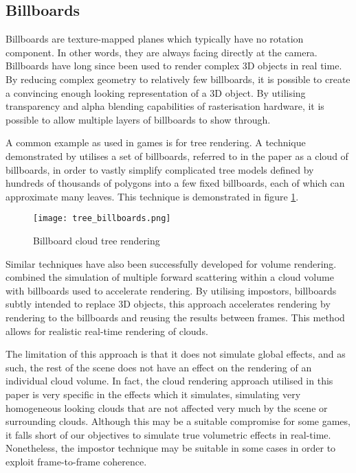 \subsection{Billboards}
Billboards are texture-mapped planes which typically have no rotation component. In other words, they are always facing directly at the camera. Billboards have long since been used to render complex 3D objects in real time. By reducing complex geometry to relatively few billboards, it is possible to create a convincing enough looking representation of a 3D object. By utilising transparency and alpha blending capabilities of rasterisation hardware, it is possible to allow multiple layers of billboards to show through.

A common example as used in games is for tree rendering. A technique demonstrated by \citeauthor{garcia05tree} utilises a set of billboards, referred to in the paper as a cloud of billboards, in order to vastly simplify complicated tree models defined by hundreds of thousands of polygons into a few fixed billboards, each of which can approximate many leaves. This technique is demonstrated in figure \ref{fig:billboard-cloud-trees}.

\begin{figure}
\centering
	\texttt{[image: tree\_billboards.png]}
	\caption{Billboard cloud tree rendering}
	\label{fig:billboard-cloud-trees}
\end{figure}

Similar techniques have also been successfully developed for volume rendering. \cite{harris02real} combined the simulation of multiple forward scattering within a cloud volume with billboards used to accelerate rendering. By utilising impostors, billboards subtly intended to replace 3D objects, this approach accelerates rendering by rendering to the billboards and reusing the results between frames. This method allows for realistic real-time rendering of clouds.

The limitation of this approach is that it does not simulate global effects, and as such, the rest of the scene does not have an effect on the rendering of an individual cloud volume. In fact, the cloud rendering approach utilised in this paper is very specific in the effects which it simulates, simulating very homogeneous looking clouds that are not affected very much by the scene or surrounding clouds. Although this may be a suitable compromise for some games, it falls short of our objectives to simulate true volumetric effects in real-time. Nonetheless, the impostor technique may be suitable in some cases in order to exploit frame-to-frame coherence.

